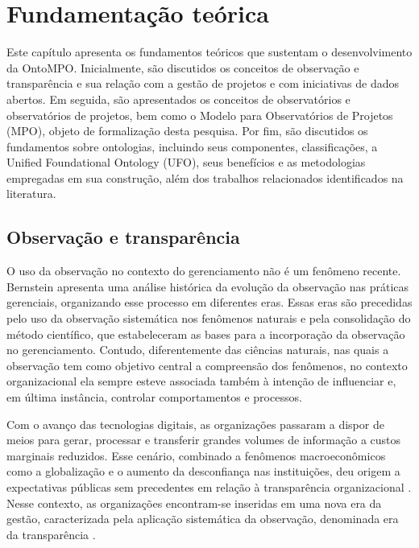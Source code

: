 \chapter{Fundamentação teórica}

Este capítulo apresenta os fundamentos teóricos que sustentam o
desenvolvimento da OntoMPO. Inicialmente, são discutidos os conceitos de
observação e transparência e sua relação com a gestão de projetos e com
iniciativas de dados abertos. Em seguida, são apresentados os conceitos de
observatórios e observatórios de projetos, bem como o Modelo para
Observatórios de Projetos (MPO), objeto de formalização desta pesquisa. Por
fim, são discutidos os fundamentos sobre ontologias, incluindo seus
componentes, classificações, a Unified Foundational Ontology (UFO), seus
benefícios e as metodologias empregadas em sua construção, além dos
trabalhos relacionados identificados na literatura.

\section{Observação e transparência}
O uso da observação no contexto do gerenciamento não é um fenômeno recente. Bernstein \cite{bernstein2017making} apresenta uma análise histórica da evolução da observação nas práticas gerenciais, organizando esse processo em diferentes eras. Essas eras são precedidas pelo uso da observação sistemática nos fenômenos naturais e pela consolidação do método científico, que estabeleceram as bases para a incorporação da observação no gerenciamento. Contudo, diferentemente das ciências naturais, nas quais a observação tem como objetivo central a compreensão dos fenômenos, no contexto organizacional ela sempre esteve associada também à intenção de influenciar e, em última instância, controlar comportamentos e processos.

Com o avanço das tecnologias digitais, as organizações passaram a dispor de meios para gerar, processar e transferir grandes volumes de informação a custos marginais reduzidos. Esse cenário, combinado a fenômenos macroeconômicos como a globalização e o aumento da desconfiança nas instituições, deu origem a expectativas públicas sem precedentes em relação à transparência organizacional \cite{heimstadt2017openwashing}. Nesse contexto, as organizações encontram-se inseridas em uma nova era da gestão, caracterizada pela aplicação sistemática da observação, denominada era da transparência \cite{bernstein2017making}.

